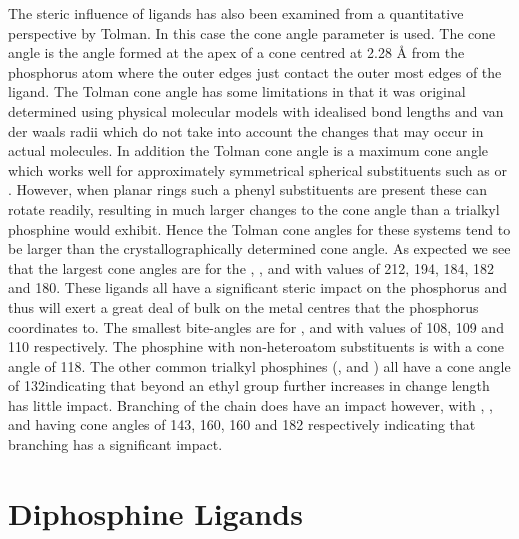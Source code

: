 The steric influence of ligands has also been examined from a quantitative perspective by Tolman.\cite{Tolman1977}  In this case the cone angle parameter is used.  The cone angle is the angle formed at the apex of a cone centred at 2.28 \si{\angstrom} from the phosphorus atom where the outer edges just contact the outer most edges of the ligand.  The Tolman cone angle has some limitations in that it was original determined using physical molecular models with idealised bond lengths and van der waals radii which do not take into account the changes that may occur in actual molecules.  In addition the Tolman cone angle is a maximum cone angle which works well for approximately symmetrical spherical substituents such as  or .  However, when planar rings such a phenyl substituents are present these can rotate readily, resulting in much larger changes to the cone angle than a trialkyl phosphine would exhibit.  Hence the Tolman cone angles for these systems tend to be larger than the crystallographically determined cone angle.  As expected we see that the largest cone angles are for the  , ,  and  with values of 212, 194, 184, 182 and 180\degrees.  These ligands all have a significant steric impact on the phosphorus and thus will exert a great deal of bulk on the metal centres that the phosphorus coordinates to.   The smallest bite-angles are for ,  and  with values of 108, 109 and 110\degrees{} respectively.  The phosphine with non-heteroatom substituents is  with a cone angle of 118\degrees.  The other common trialkyl phosphines (,  and ) all have a cone angle of 132\degrees indicating that beyond an ethyl group further increases in change length has little impact.  Branching of the chain does have an impact however, with , ,  and  having cone angles of 143, 160, 160 and 182 respectively indicating that branching has a significant impact.  

\section{Diphosphine Ligands}

